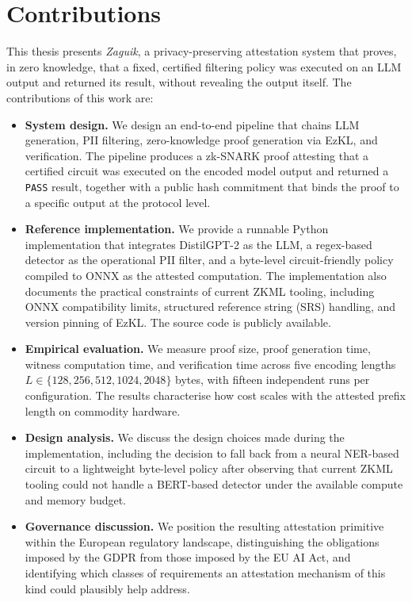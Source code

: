 \section{Contributions}
\label{sec:contributions}

This thesis presents \emph{Zaguik}, a privacy-preserving attestation system that proves, in zero knowledge, that a fixed, certified filtering policy was executed on an LLM output and returned its result, without revealing the output itself. The contributions of this work are:

\begin{itemize}
    \item \textbf{System design.} We design an end-to-end pipeline that chains LLM generation, PII filtering, zero-knowledge proof generation via EzKL, and verification. The pipeline produces a zk-SNARK proof attesting that a certified circuit was executed on the encoded model output and returned a \texttt{PASS} result, together with a public hash commitment that binds the proof to a specific output at the protocol level.
    \item \textbf{Reference implementation.} We provide a runnable Python implementation that integrates DistilGPT-2 as the LLM, a regex-based detector as the operational PII filter, and a byte-level circuit-friendly policy compiled to ONNX as the attested computation. The implementation also documents the practical constraints of current ZKML tooling, including ONNX compatibility limits, structured reference string (SRS) handling, and version pinning of EzKL. The source code is publicly available.
    \item \textbf{Empirical evaluation.} We measure proof size, proof generation time, witness computation time, and verification time across five encoding lengths $L \in \{128, 256, 512, 1024, 2048\}$ bytes, with fifteen independent runs per configuration. The results characterise how cost scales with the attested prefix length on commodity hardware.
    \item \textbf{Design analysis.} We discuss the design choices made during the implementation, including the decision to fall back from a neural NER-based circuit to a lightweight byte-level policy after observing that current ZKML tooling could not handle a BERT-based detector under the available compute and memory budget.
    \item \textbf{Governance discussion.} We position the resulting attestation primitive within the European regulatory landscape, distinguishing the obligations imposed by the GDPR from those imposed by the EU AI Act, and identifying which classes of requirements an attestation mechanism of this kind could plausibly help address.
\end{itemize}

